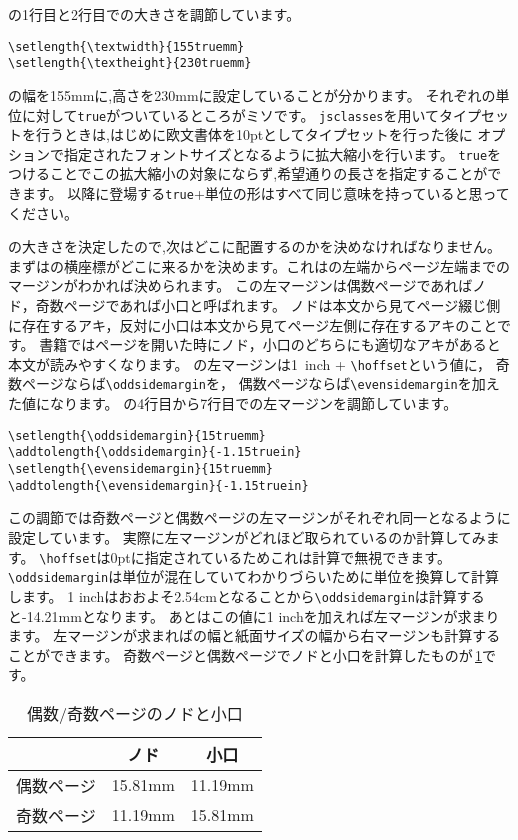 の1行目と2行目での大きさを調節しています。
\begin{verbatim}
\setlength{\textwidth}{155truemm}
\setlength{\textheight}{230truemm}
\end{verbatim}
の幅を155mmに,高さを230mmに設定していることが分かります。
それぞれの単位に対して\texttt{true}がついているところがミソです。
\texttt{jsclasses}を用いてタイプセットを行うときは,はじめに欧文書体を10ptとしてタイプセットを行った後に
オプションで指定されたフォントサイズとなるように拡大縮小を行います。
\texttt{true}をつけることでこの拡大縮小の対象にならず,希望通りの長さを指定することができます。
以降に登場する\texttt{true}+単位の形はすべて同じ意味を持っていると思ってください。

の大きさを決定したので,次はどこに配置するのかを決めなければなりません。
まずはの横座標がどこに来るかを決めます。これはの左端からページ左端までのマージンがわかれば決められます。
この左マージンは偶数ページであればノド，奇数ページであれば小口と呼ばれます。
ノドは本文から見てページ綴じ側に存在するアキ，反対に小口は本文から見てページ左側に存在するアキのことです。
書籍ではページを開いた時にノド，小口のどちらにも適切なアキがあると本文が読みやすくなります。
の左マージンは1\ inch + \verb|\hoffset|という値に，
奇数ページならば\verb|\oddsidemargin|を，
偶数ページならば\verb|\evensidemargin|を加えた値になります。
の4行目から7行目での左マージンを調節しています。

\begin{verbatim}
\setlength{\oddsidemargin}{15truemm}
\addtolength{\oddsidemargin}{-1.15truein}
\setlength{\evensidemargin}{15truemm}
\addtolength{\evensidemargin}{-1.15truein}
\end{verbatim}

この調節では奇数ページと偶数ページの左マージンがそれぞれ同一となるように設定しています。
実際に左マージンがどれほど取られているのか計算してみます。
\verb|\hoffset|は0ptに指定されているためこれは計算で無視できます。
\verb|\oddsidemargin|は単位が混在していてわかりづらいために単位を換算して計算します。
1 inchはおおよそ2.54cmとなることから\verb|\oddsidemargin|は計算すると-14.21mmとなります。
あとはこの値に1 inchを加えれば左マージンが求まります。
左マージンが求まればの幅と紙面サイズの幅から右マージンも計算することができます。
奇数ページと偶数ページでノドと小口を計算したものが\tablename\,\ref{tbl:oddevenmargins}です。
\begin{table}[!ht]
	\centering
	\caption{偶数/奇数ページのノドと小口}
	\label{tbl:oddevenmargins}
	\begin{tabular}{c|cc} \hline \hline
		& ノド & 小口 \\ \hline
		偶数ページ & 15.81mm & 11.19mm \\
		奇数ページ & 11.19mm & 15.81mm \\ \hline
	\end{tabular}
\end{table} 

